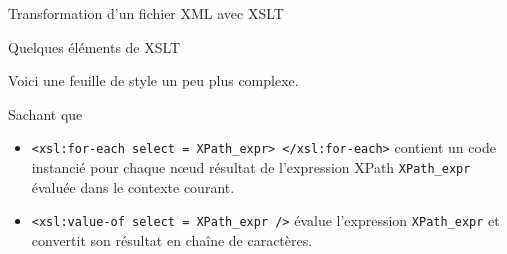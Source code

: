\begin{frame}{Transformation d'un fichier XML avec XSLT}
\framebreak

\begin{center}
\begin{minipage}{0.8\textwidth}

\end{minipage}
\end{center}

\end{frame} 

\begin{frame}{Quelques \'el\'ements de XSLT}

Voici une feuille de style un peu plus complexe.

\begin{center}
\begin{minipage}{\textwidth}

\end{minipage}
\end{center}

\begin{exoblock}
Sachant que 
\begin{itemize}
\item \verb?<xsl:for-each select = XPath_expr> </xsl:for-each>? contient un code instanci\'e pour chaque n{\oe}ud r\'esultat de l'expression XPath \verb?XPath_expr? \'evalu\'ee dans le contexte courant.
\item \verb?<xsl:value-of select = XPath_expr />? \'evalue l'expression  \verb?XPath_expr? et convertit son r\'esultat en cha\^ine de caractères.
\end{itemize}


\end{exoblock}
\end{frame}
